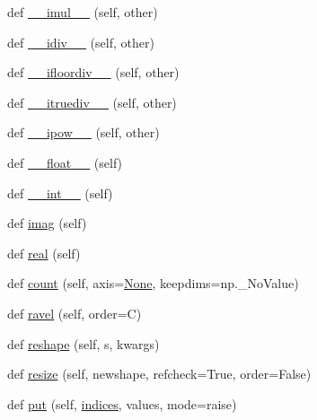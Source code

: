 \begin{DoxyCompactItemize}
\item 
def \hyperlink{classnumpy_1_1ma_1_1core_1_1MaskedArray_a795a715ceae2279d968bb8f8606d9d3b}{\+\_\+\+\_\+imul\+\_\+\+\_\+} (self, other)
\item 
def \hyperlink{classnumpy_1_1ma_1_1core_1_1MaskedArray_a1dda203fd385f64c59d8cc4fbf80288a}{\+\_\+\+\_\+idiv\+\_\+\+\_\+} (self, other)
\item 
def \hyperlink{classnumpy_1_1ma_1_1core_1_1MaskedArray_a9db457cb6608357b6d9dbf84d2f4c29a}{\+\_\+\+\_\+ifloordiv\+\_\+\+\_\+} (self, other)
\item 
def \hyperlink{classnumpy_1_1ma_1_1core_1_1MaskedArray_a26ecf541f484d8c59654625f26e56618}{\+\_\+\+\_\+itruediv\+\_\+\+\_\+} (self, other)
\item 
def \hyperlink{classnumpy_1_1ma_1_1core_1_1MaskedArray_a961ec170bb89b274060277deddcaf48d}{\+\_\+\+\_\+ipow\+\_\+\+\_\+} (self, other)
\item 
def \hyperlink{classnumpy_1_1ma_1_1core_1_1MaskedArray_a5aaf0fa1645158598e822499d66e0349}{\+\_\+\+\_\+float\+\_\+\+\_\+} (self)
\item 
def \hyperlink{classnumpy_1_1ma_1_1core_1_1MaskedArray_a636214d91c9e22209720229fe1f175ed}{\+\_\+\+\_\+int\+\_\+\+\_\+} (self)
\item 
def \hyperlink{classnumpy_1_1ma_1_1core_1_1MaskedArray_a35f630552a387e879468d97fcf4e93de}{imag} (self)
\item 
def \hyperlink{classnumpy_1_1ma_1_1core_1_1MaskedArray_a9438d5c4ef1da0b2492579d881ab9813}{real} (self)
\item 
def \hyperlink{classnumpy_1_1ma_1_1core_1_1MaskedArray_a42082174d873c594f55f3fb0e7751855}{count} (self, axis=\hyperlink{namespacenumpy_1_1ma_1_1core_a647ee1848dfa3692fe35a663a2aa40b3}{None}, keepdims=np.\+\_\+\+No\+Value)
\item 
def \hyperlink{classnumpy_1_1ma_1_1core_1_1MaskedArray_ac230635367ee8b1f153642318663a28c}{ravel} (self, order=\textquotesingle{}C\textquotesingle{})
\item 
def \hyperlink{classnumpy_1_1ma_1_1core_1_1MaskedArray_a7d038e870209e021ece2e5b14bfe7f2c}{reshape} (self, s, kwargs)
\item 
def \hyperlink{classnumpy_1_1ma_1_1core_1_1MaskedArray_a53c8d5d7876eab18234444902715cee5}{resize} (self, newshape, refcheck=True, order=False)
\item 
def \hyperlink{classnumpy_1_1ma_1_1core_1_1MaskedArray_a048bd7a9ff645e2b94ac7e77bf8d7dfc}{put} (self, \hyperlink{namespacenumpy_1_1ma_1_1core_a1cba93d768a61f51e74e5c5f7e8233f7}{indices}, values, mode=\textquotesingle{}raise\textquotesingle{})

\end{DoxyCompactItemize}
